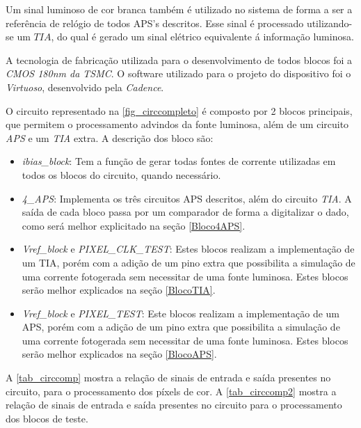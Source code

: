 Um sinal luminoso de cor branca tamb\'em \'e utilizado no sistema de forma a ser a refer\^encia de rel\'ogio de todos APS's descritos. Esse sinal \'e processado utilizando-se um $TIA$, do qual \'e gerado um sinal el\'etrico equivalente \'a informa{\c c}\~ao luminosa.

A tecnologia de fabrica{\c c}\~ao utilizada para o desenvolvimento de todos blocos foi a \emph{CMOS 180nm da TSMC}. O software utilizado para o projeto do dispositivo foi o \emph{Virtuoso}, desenvolvido pela \emph{Cadence}.

O circuito representado na \autoref{fig_circcompleto} \'e composto por 2 blocos principais, que permitem o processamento advindos da fonte luminosa, al\'em de um circuito \emph{APS} e um \emph{TIA} extra. A descri{\c c}\~ao dos bloco s\~ao:

\begin{itemize}
    \item \emph{ibias\_block}: Tem a fun{\c c}\~ao de gerar todas fontes de corrente utilizadas em todos os blocos do circuito, quando necess\'ario.
    
    \item \emph{4\_APS}: Implementa os tr\^es circuitos APS descritos, al\'em do circuito \emph{TIA}. A sa\'ida de cada bloco passa por um comparador de forma a digitalizar o dado, como ser\'a melhor explicitado na se{\c c}\~ao \autoref{Bloco4APS}.
    
    \item \emph{Vref\_block} e \emph{PIXEL\_CLK\_TEST}: Estes blocos realizam a implementa{\c c}\~ao de um TIA, por\'em com a adi{\c c}\~ao de um pino extra que possibilita a simula{\c c}\~ao de uma corrente fotogerada sem necessitar de uma fonte luminosa. Estes blocos ser\~ao melhor explicados na se{\c c}\~ao \autoref{BlocoTIA}. 
    
    \item \emph{Vref\_block} e \emph{PIXEL\_TEST}: Este blocos realizam a implementa{\c c}\~ao de um APS, por\'em com a adi{\c c}\~ao de um pino extra que possibilita a simula{\c c}\~ao de uma corrente fotogerada sem necessitar de uma fonte luminosa. Estes blocos ser\~ao melhor explicados na se{\c c}\~ao \autoref{BlocoAPS}.
    
\end{itemize}

A \autoref{tab_circcomp} mostra a rela{\c c}\~ao de sinais de entrada e sa\'ida presentes no circuito, para o processamento dos p\'ixels de cor. A \autoref{tab_circcomp2} mostra a rela{\c c}\~ao de sinais de entrada e sa\'ida presentes no circuito para o processamento dos blocos de teste.

